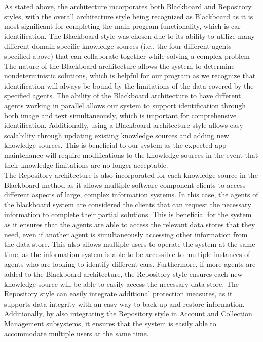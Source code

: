 \documentclass[]{article}
\begin{document}
\noindent As stated above, the architecture incorporates both Blackboard and Repository styles, with the overall architecture style being recognized as Blackboard as it is most significant for completing the main program functionality, which is car identification. The Blackboard style was chosen due to its ability to utilize many different domain-specific knowledge sources (i.e., the four different agents specified above) that can collaborate together while solving a complex problem\\

\noindent The nature of the Blackboard architecture allows the system to determine nondeterministic solutions, which is helpful for our program as we recognize that identification will always be bound by the limitations of the data covered by the specified agents. The ability of the Blackboard architecture to have different agents working in parallel allows our system to support identification through both image and text simultaneously, which is important for comprehensive identification. Additionally, using a Blackboard architecture style allows easy scalability through updating existing knowledge sources and adding new knowledge sources. This is beneficial to our system as the expected app maintenance will require modifications to the knowledge sources in the event that their knowledge limitations are no longer acceptable.\\

\noindent The Repository architecture is also incorporated for each knowledge source in the Blackboard method as it allows multiple software component clients to access different aspects of large, complex information systems. In this case, the agents of the blackboard system are considered the clients that can request the necessary information to complete their partial solutions. This is beneficial for the system as it ensures that the agents are able to access the relevant data stores that they need, even if another agent is simultaneously accessing other information from the data store. This also allows multiple users to operate the system at the same time, as the information system is able to be accessible to multiple instances of agents who are looking to identify different cars. Furthermore, if more agents are added to the Blackboard architecture, the Repository style ensures each new knowledge source will be able to easily access the necessary data store. The Repository style can easily integrate additional protection measures, as it supports data integrity with an easy way to back up and restore information. Additionally, by also integrating the Repository style in Account and Collection Management subsystems, it ensures that the system is easily able to accommodate multiple users at the same time.\\
\end{document}
